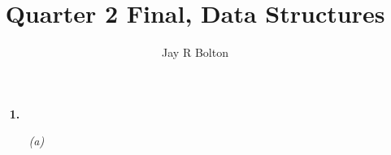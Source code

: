 \documentclass{article}
\title{Quarter 2 Final, Data Structures}
\author{Jay R Bolton}
\begin{document}
\maketitle

\begin{enumerate}

\item[\textbf{1.}]
  \begin{enumerate}
		\item[\emph{(a)}]
		\ovalbox{
			\Tree[.3 2 [.5 [.6 [.7 [.20 [.8 [.9 [.12 [.15 [17] ] ] ] ] 30 ] ] ] ] ] ]
		}

\end{enumerate}


\end{enumerate}
\end{document}
